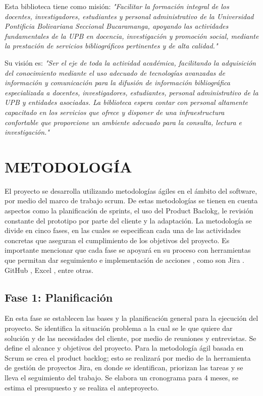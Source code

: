 \documentclass[spanish]{ieee_upb}
\begin{document}
Esta biblioteca tiene como misión:
\textit{"Facilitar la formación integral de los docentes, investigadores, estudiantes y personal administrativo de la Universidad Pontificia Bolivariana Seccional Bucaramanga, apoyando las actividades fundamentales de la UPB en docencia, investigación y promoción social, mediante la prestación de servicios bibliográficos pertinentes y de alta calidad."}\cite{UPB_Biblioteca}
\vspace{0.3 cm}

Su visión es:
\textit{"Ser el eje de toda la actividad académica, facilitando la adquisición del conocimiento mediante el uso adecuado de tecnologías avanzadas de información y comunicación para la difusión de información bibliográfica especializada a docentes, investigadores, estudiantes, personal administrativo de la UPB y entidades asociadas. La biblioteca espera contar con personal altamente capacitado en los servicios que ofrece y disponer de una infraestructura confortable que proporcione un ambiente adecuado para la consulta, lectura e investigación."} \cite{UPB_Biblioteca}



\newpage
\section{METODOLOGÍA}

El proyecto se desarrolla utilizando metodologías ágiles en el ámbito del software, por medio del marco de trabajo scrum. De estas metodologías se tienen en cuenta aspectos como la planificación de sprints, el uso del Product Baclokg, le revisión constante del prototipo por parte del cliente y la adaptación. La metodología se divide en cinco fases, en las cuales se especifican cada una de las actividades concretas que aseguran el cumplimiento de los objetivos del proyecto.  Es importante mencionar que cada fase se apoyará en su proceso con herramientas que permitan dar seguimiento e implementación de acciones , como son Jira . GitHub , Excel , entre otras.  
 

\subsection*{Fase 1: Planificación}

En esta fase se establecen las bases y la planificación general para la ejecución del proyecto. Se identifica la situación problema a la cual se le que quiere dar solución y de las necesidades del cliente, por medio de reuniones y entrevistas. Se define el alcance y objetivos del proyecto. Para la metodología ágil basada en Scrum se crea el product backlog; esto se realizará por medio de la herramienta de gestión de proyectos Jira, en donde se identifican, priorizan las tareas y se lleva el seguimiento del trabajo. Se elabora un cronograma para 4 meses, se estima el presupuesto y se realiza el anteproyecto.
\end{document}
